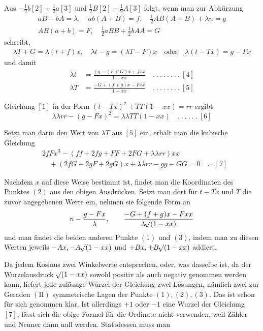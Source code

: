 %
Aus \(-\frac12b[2]+\frac12a[3]\) und \(\frac12B[2]-\frac12A[3]\) folgt, wenn man zur Abkürzung
\[\begin{gathered}aB-bA=\lambda,\quad ab(A+B)=f,\quad\tfrac12AB(A+B)+\lambda n=g\\
AB(a+b)=F,\quad\tfrac12aBB+\tfrac12bAA=G\end{gathered}\]
schreibt,
\[\begin{gathered}\lambda T+G=\lambda(t+f)x,\quad\lambda t-g=(\lambda T-F)x\quad\text{oder}\quad\lambda(t-Tx)=g-Fx\end{gathered}\]
und damit
\[\begin{aligned}\lambda t&=\frac{+g-(F+G)x+fxx}{1-xx}\quad.\ .\ .\ .\ .\ .\ .\ .\ [4]\\
\lambda T&=\frac{-G+(f+g)x-Fxx}{1-xx}\quad.\ .\ .\ .\ .\ .\ .\ .\ [5]\end{aligned}\]
\par
Gleichung \([1]\) in der Form \((t-Tx)^2+TT(1-xx)=rr\) ergibt
\[\lambda\lambda rr-(g-Fx)^2=\lambda\lambda TT(1-xx)\quad.\ .\ .\ .\ .\ .\ [6]\]
\par
Setzt man darin den Wert von \(\lambda T\) aus \([5]\) ein, erhält man die kubische Gleichung
\[\begin{aligned}&2fFx^3-(ff+2fg+FF+2FG+\lambda\lambda rr)xx\\
&\quad+(2fG+2gF+2gG)x+\lambda\lambda rr-gg-GG=0\quad.\ .\ [7]\end{aligned}\]
\par
Nachdem \(x\) auf diese Weise bestimmt ist, findet man die Koordinaten des Punktes \((2)\) aus den obigen Ausdrücken. Setzt man dort für \(t-Tx\) und \(T\) die zuvor angegebenen Werte ein, nehmen sie folgende Form an
\[n-\frac{g-Fx}{\lambda},\qquad\frac{-G+(f+g)x-Fxx}{\lambda\mathord{{}^{}\!\surd}(1-xx)}\]
und man findet die beiden anderen Punkte \((1)\) und \((3)\), indem man zu diesen Werten jeweils \(-Ax,-A\mathord{{}^{}\!\surd}(1-xx)\) und \(+Bx,+B\mathord{{}^{}\!\surd}(1-xx)\) addiert.

Da jedem Kosinus zwei Winkelwerte entsprechen, oder, was dasselbe ist, da der Wurzelausdruck \(\mathord{{}^{}\!\surd}(1-xx)\) sowohl positiv als auch negativ genommen werden kann, liefert jede zulässige Wurzel der Gleichung zwei Lösungen, nämlich zwei zur Geraden \(\mathrm{(II)}\) symmetrische Lagen der Punkte \((1),(2),(3)\). Das ist schon für sich genommen klar. Ist allerdings \(+1\) oder \(-1\) eine Wurzel der Gleichung \([7]\), lässt sich die obige Formel für die Ordinate nicht verwenden, weil Zähler und Nenner dann null werden. Stattdessen muss man
